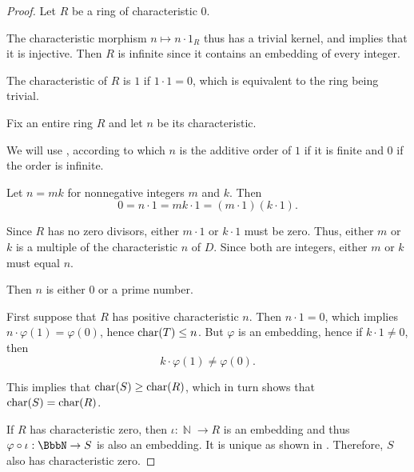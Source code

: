 \begin{proof}
   Let \( R \) be a ring of characteristic \( 0 \).

  The characteristic morphism \( n \mapsto n \cdot 1_R \) thus has a trivial kernel, and  implies that it is injective. Then \( R \) is infinite since it contains an embedding of every integer.

   The characteristic of \( R \) is \( 1 \) if \( 1 \cdot 1 = 0 \), which is equivalent to the ring being trivial.

   Fix an entire ring \( R \) and let \( n \) be its characteristic.

  We will use , according to which \( n \) is the additive order of \( 1 \) if it is finite and \( 0 \) if the order is infinite.

  Let \( n = mk \) for nonnegative integers \( m \) and \( k \). Then
  \begin{equation*}
    0 = n \cdot 1 = mk \cdot 1 = (m \cdot 1) (k \cdot 1).
  \end{equation*}

  Since \( R \) has no zero divisors, either \( m \cdot 1 \) or \( k \cdot 1 \) must be zero. Thus, either \( m \) or \( k \) is a multiple of the characteristic \( n \) of \( D \). Since both are integers, either \( m \) or \( k \) must equal \( n \).

  Then \( n \) is either \( 0 \) or a prime number.

   First suppose that \( R \) has positive characteristic \( n \). Then \( n \cdot 1 = 0 \), which implies \( n \cdot \varphi(1) = \varphi(0) \), hence \( \op{char}(T) \leq n \). But \( \varphi \) is an embedding, hence if \( k \cdot 1 \neq 0 \), then
  \begin{equation*}
    k \cdot \varphi(1) \neq \varphi(0).
  \end{equation*}

  This implies that \( \op{char}(S) \geq \op{char}(R) \), which in turn shows that \( \op{char}(S) = \op{char}(R) \).

  If \( R \) has characteristic zero, then \( \iota: \BbbN \to R \) is an embedding and thus \( \varphi \bincirc \iota: \BbbN \to S \) is also an embedding. It is unique as shown in . Therefore, \( S \) also has characteristic zero.
\end{proof}

